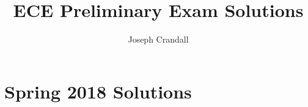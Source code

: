 
\usepackage{algorithm, algpseudocode, chemformula, color, gensymb, siunitx, soul, subfiles}
\usepackage[a4paper]{geometry}

\title{ECE Preliminary Exam Solutions}
\author{Joseph Crandall}


\maketitle

%

\section{Spring 2018 Solutions}




